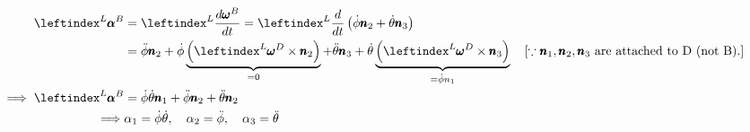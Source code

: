 \begin{align*}
    \lx{^L}{\pmb \alpha}{^B} &= \lx{^L}{\frac{d \pmb \omega^B}{d t}}
    = \lx{^L}{\frac{d}{d t}} \left( \dot \phi \pmb n_2 + \dot \theta \pmb n_3 \right)\\
    &= \ddot \phi \pmb n_2 + \dot \phi \underbrace{\left( \lx{^L}{\pmb \omega}{^D} \times \pmb n_2 \right)}_{=0} +
    \ddot \theta \pmb n_3 + \dot \theta \underbrace{\left( \lx{^L}{\pmb \omega}{^D} \times \pmb n_3 \right)}_{=\dot \phi n_1}
    \quad \left[\because \pmb n_1, \pmb n_2, \pmb n_3 \text{ are attached to D (not B)}. \right]\\
    \implies \lx{^L}{\pmb \alpha}{^B} &= \dot \phi \dot \theta \pmb n_1 + \ddot \phi \pmb n_2 + \ddot \theta \pmb n_2\\
    \implies& \alpha_1 = \dot \phi \dot \theta, \quad
    \alpha_2 = \ddot \phi, \quad
    \alpha_3 = \ddot \theta
\end{align*}
